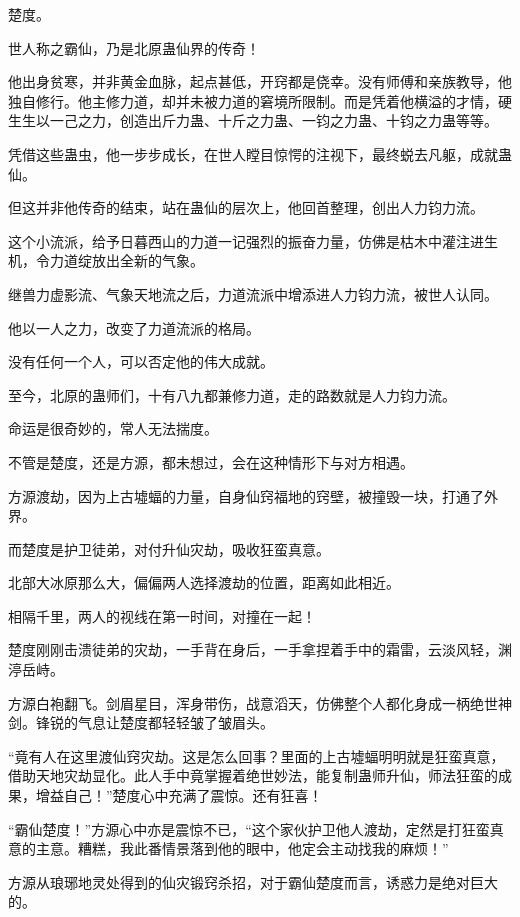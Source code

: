 
\begin{this_body}

楚度。

世人称之霸仙，乃是北原蛊仙界的传奇！

他出身贫寒，并非黄金血脉，起点甚低，开窍都是侥幸。没有师傅和亲族教导，他独自修行。他主修力道，却并未被力道的窘境所限制。而是凭着他横溢的才情，硬生生以一己之力，创造出斤力蛊、十斤之力蛊、一钧之力蛊、十钧之力蛊等等。

凭借这些蛊虫，他一步步成长，在世人瞠目惊愕的注视下，最终蜕去凡躯，成就蛊仙。

但这并非他传奇的结束，站在蛊仙的层次上，他回首整理，创出人力钧力流。

这个小流派，给予日暮西山的力道一记强烈的振奋力量，仿佛是枯木中灌注进生机，令力道绽放出全新的气象。

继兽力虚影流、气象天地流之后，力道流派中增添进人力钧力流，被世人认同。

他以一人之力，改变了力道流派的格局。

没有任何一个人，可以否定他的伟大成就。

至今，北原的蛊师们，十有八九都兼修力道，走的路数就是人力钧力流。

命运是很奇妙的，常人无法揣度。

不管是楚度，还是方源，都未想过，会在这种情形下与对方相遇。

方源渡劫，因为上古墟蝠的力量，自身仙窍福地的窍壁，被撞毁一块，打通了外界。

而楚度是护卫徒弟，对付升仙灾劫，吸收狂蛮真意。

北部大冰原那么大，偏偏两人选择渡劫的位置，距离如此相近。

相隔千里，两人的视线在第一时间，对撞在一起！

楚度刚刚击溃徒弟的灾劫，一手背在身后，一手拿捏着手中的霜雷，云淡风轻，渊渟岳峙。

方源白袍翻飞。剑眉星目，浑身带伤，战意滔天，仿佛整个人都化身成一柄绝世神剑。锋锐的气息让楚度都轻轻皱了皱眉头。

“竟有人在这里渡仙窍灾劫。这是怎么回事？里面的上古墟蝠明明就是狂蛮真意，借助天地灾劫显化。此人手中竟掌握着绝世妙法，能复制蛊师升仙，师法狂蛮的成果，增益自己！”楚度心中充满了震惊。还有狂喜！

“霸仙楚度！”方源心中亦是震惊不已，“这个家伙护卫他人渡劫，定然是打狂蛮真意的主意。糟糕，我此番情景落到他的眼中，他定会主动找我的麻烦！”

方源从琅琊地灵处得到的仙灾锻窍杀招，对于霸仙楚度而言，诱惑力是绝对巨大的。


\end{this_body}
